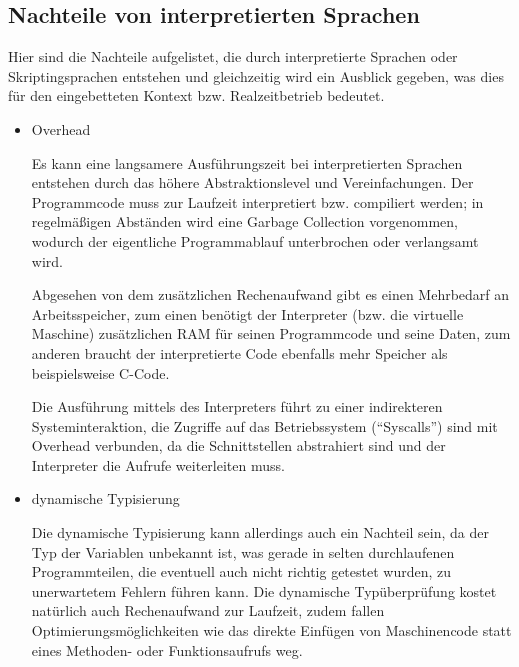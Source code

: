 \subsection{Nachteile von interpretierten Sprachen}


Hier sind die Nachteile aufgelistet, die durch interpretierte Sprachen oder
Skriptingsprachen entstehen und gleichzeitig wird ein Ausblick gegeben, was
dies für den eingebetteten Kontext bzw. Realzeitbetrieb bedeutet.


\begin{itemize}

  \item Overhead

        Es kann eine langsamere Ausführungszeit bei interpretierten Sprachen
        entstehen durch das höhere Abstraktionslevel und Vereinfachungen.
        Der Programmcode muss zur Laufzeit interpretiert bzw. compiliert
        werden; in regelmäßigen Abständen wird eine Garbage Collection
        vorgenommen, wodurch der eigentliche Programmablauf unterbrochen oder
        verlangsamt wird.

        Abgesehen von dem zusätzlichen Rechenaufwand gibt es einen Mehrbedarf
        an Arbeitsspeicher, zum einen benötigt der Interpreter (bzw. die
        virtuelle Maschine) zusätzlichen RAM für seinen Programmcode und seine
        Daten, zum anderen braucht der interpretierte Code ebenfalls mehr
        Speicher als beispielsweise C-Code.

        Die Ausführung mittels des Interpreters führt zu einer indirekteren
        Systeminteraktion, die Zugriffe auf das Betriebssystem (“Syscalls”)
        sind mit Overhead verbunden, da die Schnittstellen abstrahiert sind
        und der Interpreter die Aufrufe weiterleiten muss.

  \item dynamische Typisierung

        Die dynamische Typisierung kann allerdings auch ein Nachteil sein,
        da der Typ der Variablen unbekannt ist, was gerade in selten
        durchlaufenen Programmteilen, die eventuell auch nicht richtig
        getestet wurden, zu unerwartetem Fehlern führen kann. Die dynamische
        Typüberprüfung kostet natürlich auch Rechenaufwand zur Laufzeit,
        zudem fallen Optimierungsmöglichkeiten wie das direkte Einfügen von
        Maschinencode statt eines Methoden- oder Funktionsaufrufs weg.

\end{itemize}


